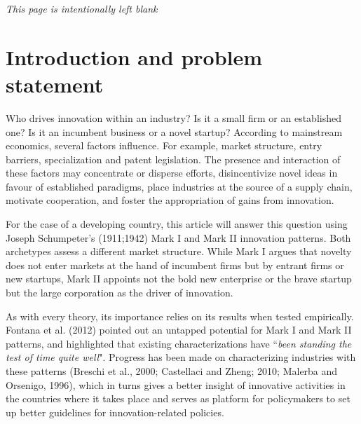 \documentclass[12pt,a4paper]{article}
\begin{document}
\newpage

\vspace*{\fill}

\begin{center}
	\textit{This page is intentionally left blank}
\end{center}

\vspace*{\fill}

\pagebreak
	
	
\tableofcontents \newpage
\listoffigures
\listoftables \newpage
{}
\setcounter{page}{1}



\section{Introduction and problem statement}
	
Who drives innovation within an industry? Is it a small firm or an established one? Is it an incumbent business or a novel startup? According to mainstream economics, several factors influence. For example, market structure, entry barriers, specialization and patent legislation. The presence and interaction of these factors may concentrate or disperse efforts, disincentivize novel ideas in favour of established paradigms, place industries at the source of a supply chain, motivate cooperation, and foster the appropriation of gains from innovation.    

For the case of a developing country, this article will answer this question using Joseph Schumpeter’s (1911;1942) Mark I and Mark II innovation patterns. Both archetypes assess a different market structure. While Mark I argues that novelty does not enter markets at the hand of incumbent firms but by entrant firms or new startups, Mark II appoints not the bold new enterprise or the brave startup but the large corporation as the driver of innovation.  

As with every theory, its importance relies on its results when tested empirically. Fontana et al. (2012) pointed out an untapped potential for Mark I and Mark II patterns, and highlighted that existing characterizations have “\textit{been standing the test of time quite well}". Progress has been made on characterizing industries with these patterns (Breschi et al., 2000; Castellaci and Zheng; 2010; Malerba and Orsenigo, 1996), which in turns gives a better insight of innovative activities in the countries where it takes place and serves as platform for policymakers to set up better guidelines for innovation-related policies.  
\end{document}
